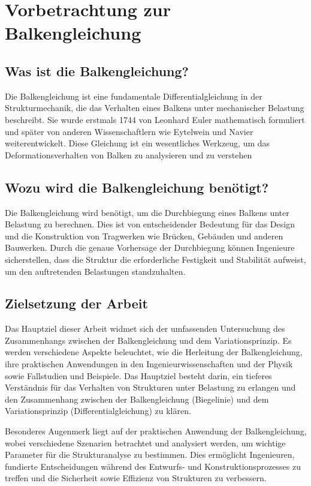 %
%
%
%
\section{Vorbetrachtung zur Balkengleichung\label{balken:section:teil0}}
\subsection{Was ist die Balkengleichung?}
Die Balkengleichung ist eine fundamentale Differentialgleichung in der Strukturmechanik, die das Verhalten eines Balkens unter mechanischer Belastung beschreibt. 
Sie wurde erstmals 1744 von Leonhard Euler mathematisch formuliert und später von anderen Wissenschaftlern wie Eytelwein und Navier weiterentwickelt. 
Diese Gleichung ist ein wesentliches Werkzeug, um das Deformationsverhalten von Balken zu analysieren und zu verstehen
\subsection{Wozu wird die Balkengleichung benötigt?}
Die Balkengleichung wird benötigt, um die Durchbiegung eines Balkens unter Belastung zu berechnen.
Dies ist von entscheidender Bedeutung für das Design und die Konstruktion von Tragwerken wie Brücken, Gebäuden und anderen Bauwerken. 
Durch die genaue Vorhersage der Durchbiegung können Ingenieure sicherstellen, dass die Struktur die erforderliche Festigkeit und Stabilität aufweist, um den auftretenden Belastungen standzuhalten.
\subsection{Zielsetzung der Arbeit}
Das Hauptziel dieser Arbeit widmet sich der umfassenden Untersuchung des Zusammenhangs zwischen der Balkengleichung und dem Variationsprinzip. 
Es werden verschiedene Aspekte beleuchtet, wie die Herleitung der Balkengleichung, ihre praktischen Anwendungen in den Ingenieurwissenschaften und der Physik sowie Fallstudien und Beispiele. 
Das Hauptziel besteht darin, ein tieferes Verständnis für das Verhalten von Strukturen unter Belastung zu erlangen und den Zusammenhang zwischen der Balkengleichung (Biegelinie) und dem Variationsprinzip (Differentialgleichung) zu klären.

Besonderes Augenmerk liegt auf der praktischen Anwendung der Balkengleichung, wobei verschiedene Szenarien betrachtet und analysiert werden, um wichtige Parameter für die Strukturanalyse zu bestimmen. Dies ermöglicht Ingenieuren, fundierte Entscheidungen während des Entwurfs- und Konstruktionsprozesses zu treffen und die Sicherheit sowie Effizienz von Strukturen zu verbessern.

